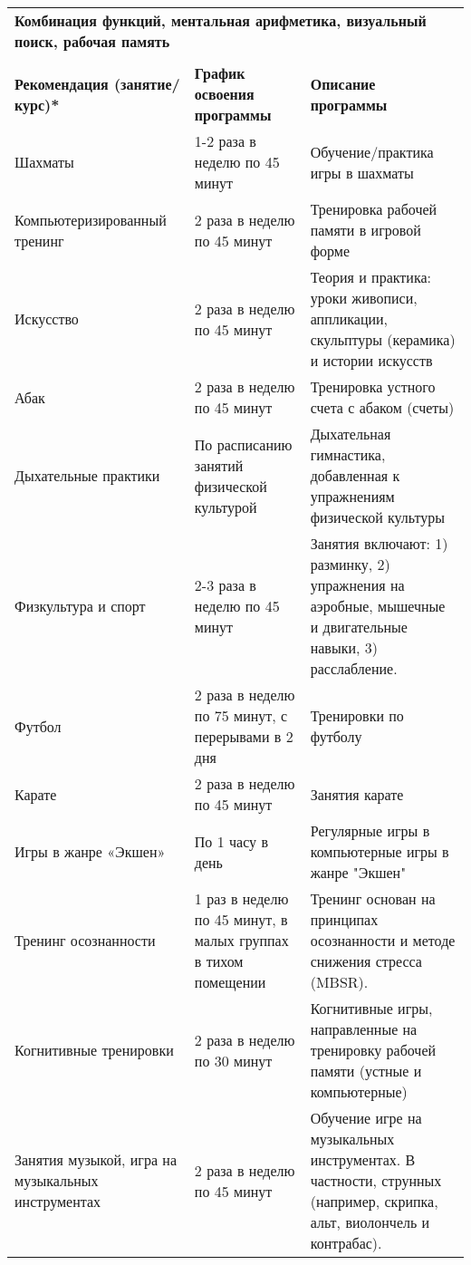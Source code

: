 \begin{center}
    \centering
    \begin{longtable}{|p{}|p{}|p{}|}
\multicolumn{3}{l}{ \textbf{Комбинация функций, ментальная арифметика, визуальный поиск, рабочая память}}\\
\multicolumn{3}{c}{}\\\hline
    \textbf{Рекомендация (занятие/курс)*} & \textbf{График освоения программы} &   \textbf{Описание программы} \\ \hline
    Шахматы & 1-2 раза в неделю по 45 минут & Обучение/практика игры в шахматы \\ \hline
    Компьютеризированный тренинг & 2 раза в неделю по 45 минут & Тренировка рабочей памяти в игровой форме \\ \hline
    Искусство & 2 раза в неделю по 45 минут & Теория и практика: уроки живописи, аппликации, скульптуры (керамика) и истории искусств \\ \hline
    Абак & 2 раза в неделю по 45 минут & Тренировка устного счета с абаком (счеты) \\ \hline
    Дыхательные практики & По расписанию занятий физической культурой & Дыхательная гимнастика, добавленная к упражнениям физической культуры \\ \hline
    Физкультура и спорт & 2-3 раза в неделю по 45 минут & Занятия включают: 1) разминку, 2) упражнения на аэробные, мышечные и двигательные навыки, 3) расслабление. 
 \\ \hline
    Футбол & 2 раза в неделю по 75 минут, с перерывами в 2 дня & Тренировки по футболу \\ \hline
    Карате & 2 раза в неделю по 45 минут & Занятия карате \\ \hline
    Игры в жанре «Экшен» & По 1 часу в день & Регулярные игры в компьютерные игры в жанре "Экшен" \\ \hline
    Тренинг осознанности & 1 раз в неделю по 45 минут, в малых группах в тихом помещении & Тренинг основан на принципах осознанности и методе снижения стресса (MBSR). \\ \hline
    Когнитивные тренировки & 2 раза в неделю по 30 минут & Когнитивные игры, направленные на тренировку рабочей памяти (устные и компьютерные) \\ \hline
    Занятия музыкой, игра на музыкальных инструментах & 2 раза в неделю по 45 минут & Обучение игре на музыкальных инструментах. В частности, струнных (например, скрипка, альт, виолончель и контрабас).  \\ \hline

\end{longtable}
\end{center}
